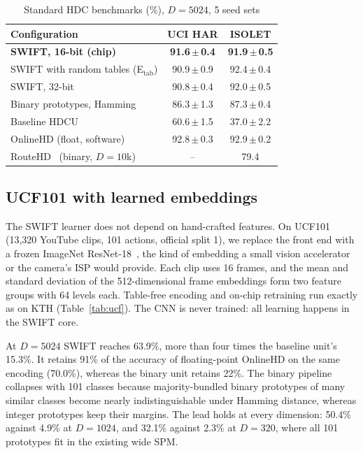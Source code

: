 \documentclass[conference]{IEEEtran}
\begin{document}
\begin{table}[t]
\caption{Standard HDC benchmarks (\%), $D{=}5024$, 5 seed sets}
\label{tab:uci}
\centering\scriptsize
\setlength{\tabcolsep}{4pt}
\begin{tabular}{@{}lcc@{}}
\toprule
Configuration & UCI HAR & ISOLET \\
\midrule
\textbf{SWIFT, 16-bit (chip)} & \textbf{91.6\,$\pm$\,0.4} & \textbf{91.9\,$\pm$\,0.5} \\
SWIFT with random tables (E$_{\mathrm{tab}}$) & 90.9\,$\pm$\,0.9 & 92.4\,$\pm$\,0.4 \\
SWIFT, 32-bit & 90.8\,$\pm$\,0.4 & 92.0\,$\pm$\,0.5 \\
Binary prototypes, Hamming & 86.3\,$\pm$\,1.3 & 87.3\,$\pm$\,0.4 \\
Baseline HDCU & 60.6\,$\pm$\,1.5 & 37.0\,$\pm$\,2.2 \\
OnlineHD (float, software) & 92.8\,$\pm$\,0.3 & 92.9\,$\pm$\,0.2 \\
RouteHD~\cite{sahruri2026routehd} (binary, $D{=}10$k) & -- & 79.4 \\
\bottomrule
\end{tabular}
\end{table}

\subsection{UCF101 with learned embeddings}
\label{sec:ucf}
The SWIFT learner does not depend on hand-crafted features. On UCF101~\cite{ucf101} (13,320 YouTube clips, 101 actions, official split 1), we replace the front end with a frozen ImageNet ResNet-18~\cite{resnet}, the kind of embedding a small vision accelerator or the camera's ISP would provide. Each clip uses 16 frames, and the mean and standard deviation of the 512-dimensional frame embeddings form two feature groups with 64 levels each. Table-free encoding and on-chip retraining run exactly as on KTH (Table~\ref{tab:ucf}). The CNN is never trained: all learning happens in the SWIFT core.

At $D{=}5024$ SWIFT reaches 63.9\%, more than four times the baseline unit's 15.3\%. It retains 91\% of the accuracy of floating-point OnlineHD on the same encoding (70.0\%), whereas the binary unit retains 22\%. The binary pipeline collapses with 101 classes because majority-bundled binary prototypes of many similar classes become nearly indistinguishable under Hamming distance, whereas integer prototypes keep their margins. The lead holds at every dimension: 50.4\% against 4.9\% at $D{=}1024$, and 32.1\% against 2.3\% at $D{=}320$, where all 101 prototypes fit in the existing wide SPM.
\end{document}
